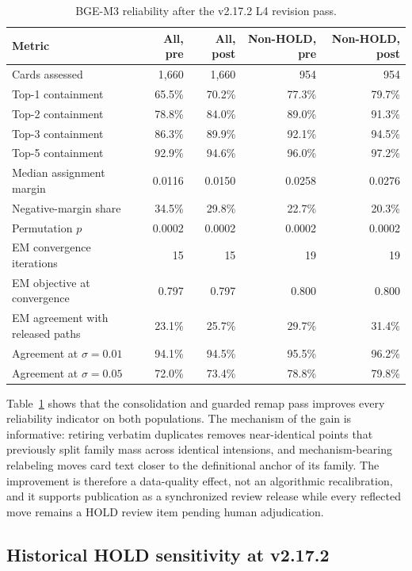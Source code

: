 \documentclass[11pt,a4paper]{article}
\begin{document}
\begin{table}[ht]
\centering
\caption{BGE-M3 reliability after the v2.17.2 L4 revision pass.}
\label{tab:v2172-bge-active}
\begin{tabular}{lrrrr}
\toprule
Metric & All, pre & All, post & Non-HOLD, pre & Non-HOLD, post \\
\midrule
Cards assessed & 1,660 & 1,660 & 954 & 954 \\
Top-1 containment & 65.5\% & 70.2\% & 77.3\% & 79.7\% \\
Top-2 containment & 78.8\% & 84.0\% & 89.0\% & 91.3\% \\
Top-3 containment & 86.3\% & 89.9\% & 92.1\% & 94.5\% \\
Top-5 containment & 92.9\% & 94.6\% & 96.0\% & 97.2\% \\
Median assignment margin & 0.0116 & 0.0150 & 0.0258 & 0.0276 \\
Negative-margin share & 34.5\% & 29.8\% & 22.7\% & 20.3\% \\
Permutation $p$ & 0.0002 & 0.0002 & 0.0002 & 0.0002 \\
EM convergence iterations & 15 & 15 & 19 & 19 \\
EM objective at convergence & 0.797 & 0.797 & 0.800 & 0.800 \\
EM agreement with released paths & 23.1\% & 25.7\% & 29.7\% & 31.4\% \\
Agreement at $\sigma=0.01$ & 94.1\% & 94.5\% & 95.5\% & 96.2\% \\
Agreement at $\sigma=0.05$ & 72.0\% & 73.4\% & 78.8\% & 79.8\% \\
\bottomrule
\end{tabular}
\end{table}

Table~\ref{tab:v2172-bge-active} shows that the consolidation and guarded
remap pass improves every reliability indicator on both populations. The
mechanism of the gain is informative: retiring verbatim duplicates removes
near-identical points that previously split family mass across identical
intensions, and mechanism-bearing relabeling moves card text closer to the
definitional anchor of its family. The improvement is therefore a data-quality
effect, not an algorithmic recalibration, and it supports publication as a
synchronized review release while every reflected move remains a HOLD review
item pending human adjudication.


\subsection{Historical HOLD sensitivity at v2.17.2}
\label{sec:holdsens-current}
\end{document}
